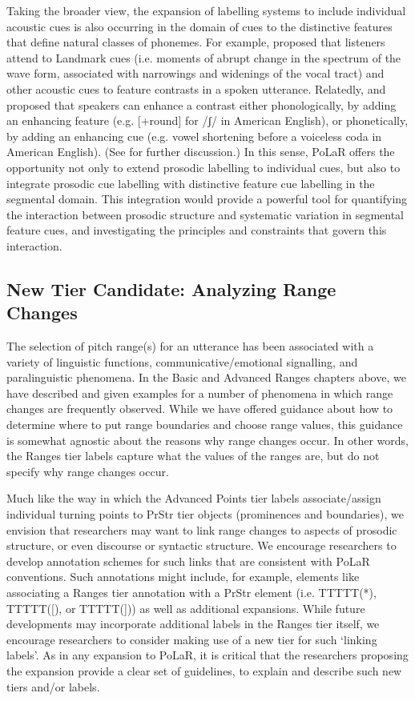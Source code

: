 \documentclass[11pt, twoside]{memoir}
\begin{document}
Taking the broader view,  the expansion of labelling systems to include individual acoustic cues is also occurring in the domain of cues to the distinctive features that define natural classes of phonemes.  For example, \citet{stevens02} proposed that listeners attend to Landmark cues (i.e. moments of abrupt change in the spectrum of the wave form, associated with narrowings and widenings of the vocal tract) and other acoustic cues to feature contrasts in a spoken utterance.  Relatedly, \citet{stevenskeyser89} and \citet{keyserstevens01} proposed that speakers can enhance a contrast either phonologically, by adding an enhancing feature (e.g. [+round] for /ʃ/ in American English), or phonetically, by adding an enhancing cue (e.g. vowel shortening before a voiceless coda in American English).  (See \citealt{clements09} for further discussion.)   In this sense, PoLaR offers the opportunity not only to extend prosodic labelling to individual cues, but also to integrate prosodic cue labelling with distinctive feature cue labelling in the segmental domain.  This integration would provide a powerful tool for quantifying the interaction between prosodic structure and systematic variation in segmental feature cues, and investigating the principles and constraints that govern this interaction.  

\subsection{New Tier Candidate: Analyzing Range Changes}\label{sec:new-tier-range-changes}
The selection of pitch range(s) for an utterance has been associated with a variety of linguistic functions, communicative\slash emotional signalling, and paralinguistic phenomena. In the Basic and Advanced Ranges chapters above, we have described and given examples for a number of phenomena in which range changes are frequently observed.  While we have offered guidance about how to determine where to put range boundaries and choose range values, this guidance is somewhat agnostic about the reasons why range changes occur. In other words, the Ranges tier labels capture what the values of the ranges are, but do not specify why range changes occur. 

Much like the way in which the Advanced Points tier labels associate\slash assign individual turning points to PrStr tier objects (prominences and boundaries), we envision that researchers may want to link range changes to aspects of prosodic structure, or even discourse or syntactic structure. We encourage researchers to develop annotation schemes for such links that are consistent with PoLaR conventions. Such annotations might include, for example, elements like associating a Ranges tier annotation with a PrStr element (i.e. TTTTT(*), TTTTT([), or TTTTT(])) as well as additional expansions. While future developments may incorporate additional labels in the Ranges tier itself, we encourage researchers to consider making use of a new tier for such ‘linking labels’. As in any expansion to PoLaR, it is critical that the researchers proposing the expansion provide a clear set of guidelines, to explain and describe such new tiers and/or labels.
\end{document}
